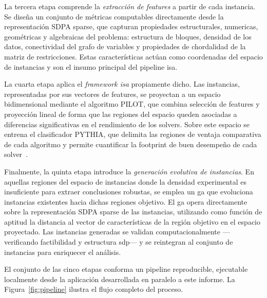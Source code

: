 La tercera etapa comprende la \textit{extracción de features} a partir
de cada instancia.
Se diseña un conjunto de métricas computables directamente desde la representación SDPA
sparse, que capturan propiedades estructurales, numericas, geométricas y algebraicas del problema: 
estructura de bloques, densidad de los datos, conectividad del grafo de variables y propiedades de
chordalidad de la matriz de restricciones.
Estas características actúan como coordenadas del espacio de instancias y son el insumo
principal del pipeline \acrshort{isa}.


La cuarta etapa aplica el \textit{framework \acrshort{isa}} propiamente dicho.
Las instancias, representadas por sus vectores de features, se proyectan a un espacio
bidimensional mediante el algoritmo PILOT, que combina selección de features y
proyección lineal de forma que las regiones del espacio queden asociadas a diferencias
significativas en el rendimiento de los solvers.
Sobre este espacio se entrena el clasificador PYTHIA, que delimita las regiones de ventaja
comparativa de cada algoritmo y permite cuantificar la footprint de buen desempeño de cada
solver~\cite{smith-milesInstanceSpaceAnalysis2023}.

Finalmente, la quinta etapa introduce la \textit{generación evolutiva de instancias}.
En aquellas regiones del espacio de instancias donde la densidad experimental es
insuficiente para extraer conclusiones robustas, se emplea un \acrfull{ga} que evoluciona
instancias existentes hacia dichas regiones objetivo.
El \acrshort{ga} opera directamente sobre la representación SDPA sparse de las instancias,
utilizando como función de aptitud la distancia al vector de características de la región
objetivo en el espacio proyectado.
Las instancias generadas se validan computacionalmente
—verificando factibilidad y estructura \acrshort{sdp}— y se reintegran al conjunto de instancias para
enriquecer el análisis.

El conjunto de las cinco etapas conforma un pipeline reproducible, ejecutable localmente desde
la aplicación desarrollada en paralelo a este informe.
La Figura~\ref{fig:pipeline} ilustra el flujo completo del proceso.


